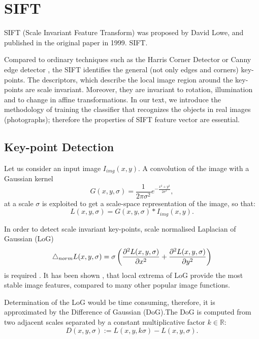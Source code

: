 \section{SIFT}
SIFT (Scale Invariant Feature Transform) was  proposed by David Lowe, and published in the original paper \cite{Lowe1999} in 1999. SIFT.

Compared to ordinary techniques such as the Harris Corner Detector \cite{Harris1988} or Canny edge detector \cite{Canny1986}, the SIFT identifies the general (not only edges and corners) key-points. The descriptors, which describe the local image region around the key-points are scale invariant. Moreover, they are invariant to rotation, illumination and to change in affine transformations. In our text, we introduce the methodology of training the classifier that recognizes the objects in real images (photographs); therefore the properties of SIFT feature vector are essential.

\subsection{Key-point Detection}

Let us consider an input image \( I_{img}(x,y) \). A convolution of the image with a Gaussian kernel
\begin{equation}
    G(x,y,\sigma) = \frac{1}{2\pi\sigma^2}e^{-\frac{x^2+y^2}{2\sigma^2}},
    \label{eq:Gaussian_kernel}
\end{equation}
at a scale \( \sigma \) is exploited to get a scale-space representation of the image, so that:
\begin{equation}
    L(x, y,\sigma) =  G(x,y,\sigma)*I_{img}(x,y).
\end{equation}

In order to detect scale invariant key-points, scale normalised Laplacian of Gaussian (LoG)
\begin{equation}
    \mathop{}\!\mathbin\bigtriangleup_{norm} L(x, y, \sigma) = \sigma\left(\frac{\partial^2 L(x,y,\sigma)}{\partial x^2} + \frac{\partial^2 L(x,y,\sigma)}{\partial y^2}\right)
\end{equation}
is required \cite{Koenderink1984}. It has been shown \cite{Mikolajczyk2002}, that local extrema of LoG provide the most stable image features, compared to many other popular image functions.

Determination of the LoG would be time consuming, therefore, it is approximated by the Difference of Gaussian (DoG)\cite{Lowe2004}.The DoG is computed from two adjacent scales separated by a constant multiplicative factor $k \in \mathbb{R}$:
\begin{equation}
    D(x,y,\sigma) := L(x,y,k\sigma) - L(x,y,\sigma).
\end{equation}

